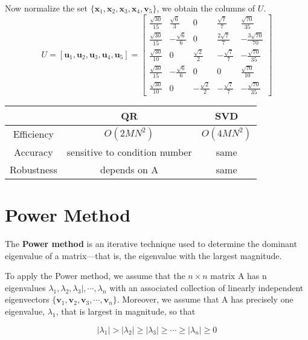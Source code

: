 \begin{ex}
\begin{solution}
		 Now normalize the set $\{\mathbf{x}_1, \mathbf{x}_2, \mathbf{x}_3, \mathbf{x}_4, \mathbf{v}_5 \}$, we obtain the columns of $U$.
		 \[ U 
		 = [\mathbf{u}_1, \mathbf{u}_2, \mathbf{u}_3, \mathbf{u}_4, \mathbf{u}_5] 
		 = \begin{bmatrix}
		 \frac{\sqrt{30}}{15} & \frac{\sqrt{6}}{3} & 0 & \frac{\sqrt{7}}{7} & \frac{\sqrt{70}}{35}\\
		 \frac{\sqrt{30}}{15} & -\frac{\sqrt{6}}{6} & 0 & \frac{2\sqrt{7}}{7} & -\frac{3\sqrt{70}}{70}\\
		 \frac{\sqrt{30}}{10} & 0 & \frac{\sqrt{2}}{2} & -\frac{\sqrt{7}}{7} & -\frac{\sqrt{70}}{35}\\
		 \frac{\sqrt{30}}{15} & -\frac{\sqrt{6}}{6} & 0 & 0 & \frac{\sqrt{70}}{10}\\
		 \frac{\sqrt{30}}{10} & 0 & -\frac{\sqrt{2}}{2} & -\frac{\sqrt{7}}{7} & -\frac{\sqrt{70}}{35} \end{bmatrix} \]
		 
	\end{solution}
\end{ex}

\begin{summary}
	\begin{tabular}{|c|c|c|}
		\hline 
		& QR & SVD \\ 
		\hline 
		Efficiency & $O(2MN^2)$ & $O(4MN^2)$ \\ 
		\hline 
		Accuracy & sensitive to condition number & same\\
		\hline
		Robustness & depends on A & same \\
		\hline
	\end{tabular} 
\end{summary}


\section{Power Method}
The \textbf{Power method} is an iterative technique used to determine the dominant eigenvalue of a matrix—that is, the eigenvalue with the largest magnitude.

To apply the Power method, we assume that the $n \times n$ matrix A has n eigenvalues
$\lambda_1, \lambda_2, \lambda_3|, \cdots,\lambda_n$ with an associated collection of linearly independent eigenvectors $\{\mathbf{v}_1, \mathbf{v}_2, \mathbf{v}_3, \cdots, \mathbf{v}_n\}$. Moreover, we assume that A has precisely one eigenvalue, $\lambda_1$, that is largest in magnitude, so that

\[ |\lambda_1| > |\lambda_2| \geq |\lambda_3| \geq \cdots \geq |\lambda_n| \geq 0 \]


